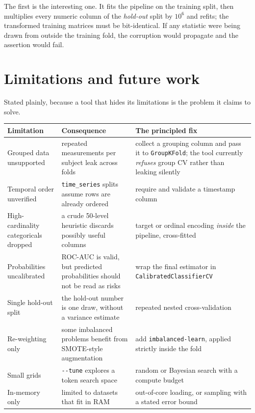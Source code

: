 \documentclass[11pt,a4paper]{article}
\begin{document}
The first is the interesting one. It fits the pipeline on the training split,
then multiplies every numeric column of the \emph{hold-out} split by $10^{6}$
and refits; the transformed training matrices must be bit-identical. If any
statistic were being drawn from outside the training fold, the corruption would
propagate and the assertion would fail.

\section{Limitations and future work}

Stated plainly, because a tool that hides its limitations is the problem it
claims to solve.

\begin{center}
\small
\begin{tabularx}{\textwidth}{L{3.5cm} L{4.4cm} X}
\toprule
\textbf{Limitation} & \textbf{Consequence} & \textbf{The principled fix} \\
\midrule
Grouped data unsupported & repeated measurements per subject leak across folds & collect a grouping column and pass it to \texttt{GroupKFold}; the tool currently \emph{refuses} group CV rather than leaking silently \\
Temporal order unverified & \texttt{time\_series} splits assume rows are already ordered & require and validate a timestamp column \\
High-cardinality categoricals dropped & a crude 50-level heuristic discards possibly useful columns & target or ordinal encoding \emph{inside} the pipeline, cross-fitted \\
Probabilities uncalibrated & ROC-AUC is valid, but predicted probabilities should not be read as risks & wrap the final estimator in \texttt{CalibratedClassifierCV} \\
Single hold-out split & the hold-out number is one draw, without a variance estimate & repeated nested cross-validation \\
Re-weighting only & some imbalanced problems benefit from SMOTE-style augmentation & add \texttt{imbalanced-learn}, applied strictly inside the fold \\
Small grids & \texttt{-{}-tune} explores a token search space & random or Bayesian search with a compute budget \\
In-memory only & limited to datasets that fit in RAM & out-of-core loading, or sampling with a stated error bound \\
\bottomrule
\end{tabularx}
\end{center}
\end{document}
